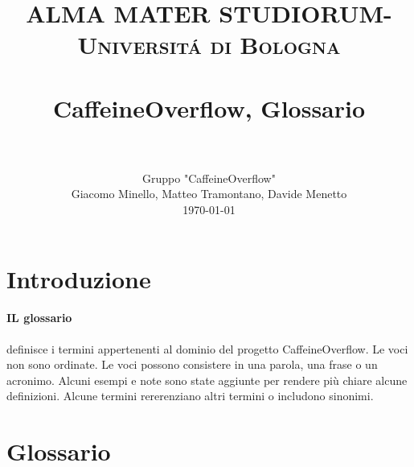 \documentclass[paper=a4, fontsize=11pt]{scrartcl}
\title{
		\usefont{OT1}{bch}{b}{n}
		\normalfont \normalsize \textsc{ALMA MATER STUDIORUM- Universit\'a di Bologna} \\ [25pt]
		\horrule{0.5pt} \\[0.4cm]
		\huge CaffeineOverflow, Glossario \\
		\horrule{2pt} \\[0.5cm]
}
\author{ Gruppo "CaffeineOverflow"\\
		\normalfont 								\normalsize
        Giacomo Minello, Matteo Tramontano, Davide Menetto\\[-3pt]		\normalsize
        \today
}
\date{}
\numberwithin{equation}{section}		%
\numberwithin{figure}{section}			%
\numberwithin{table}{section}				%
\begin{document}
\maketitle
\section{Introduzione}
\paragraph{IL glossario} definisce i termini appertenenti al dominio del progetto CaffeineOverflow. \newline
Le voci non sono ordinate. Le voci possono consistere in una parola, una frase o un acronimo. Alcuni esempi e note sono state aggiunte per rendere più chiare alcune definizioni.
Alcune termini rererenziano altri termini o includono sinonimi. 


\section{Glossario}
\end{document}
